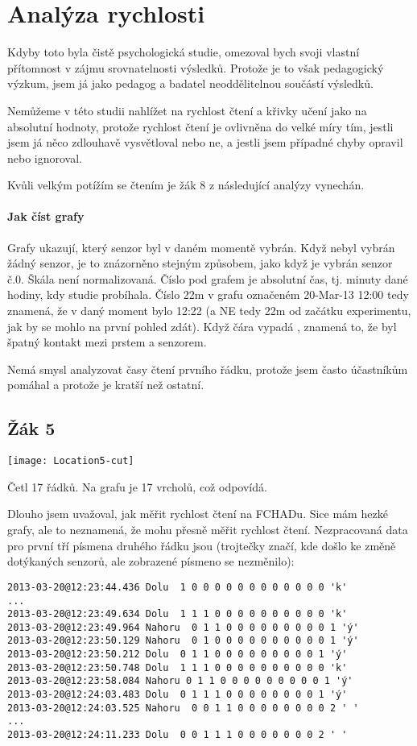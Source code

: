 \section{Analýza rychlosti}
Kdyby toto byla čistě psychologická studie, omezoval bych svoji vlastní přítomnost v zájmu srovnatelnosti výsledků.  Protože je to však pedagogický výzkum, jsem já jako pedagog a badatel neoddělitelnou součástí výsledků.

Nemůžeme v této studii nahlížet na rychlost čtení a křivky učení jako na absolutní hodnoty, protože rychlost čtení je ovlivněna do velké míry tím, jestli jsem já něco zdlouhavě vysvětloval nebo ne, a jestli jsem případné chyby opravil nebo ignoroval.

Kvůli velkým potížím se čtením je žák 8 z následující analýzy vynechán.

\paragraph{Jak číst grafy}  Grafy ukazují, který senzor byl v daném momentě vybrán.  Když nebyl vybrán žádný senzor, je to znázorněno stejným způsobem, jako když je vybrán senzor č.0.  Škála není normalizovaná. Číslo pod grafem je absolutní čas, tj. minuty dané hodiny, kdy studie probíhala.  Číslo 22m v grafu označeném 20-Mar-13 12:00 tedy znamená, že v daný moment bylo 12:22 (a NE tedy 22m od začátku experimentu, jak by se mohlo na první pohled zdát).  Když čára vypadá , znamená to, že byl špatný kontakt mezi prstem a senzorem.

Nemá smysl analyzovat časy čtení prvního řádku, protože jsem často účastníkům pomáhal a protože je kratší než ostatní.


\subsection{Žák 5}
\texttt{[image: Location5-cut]}

Četl 17 řádků. Na grafu je 17 vrcholů, což odpovídá.

Dlouho jsem uvažoval, jak měřit rychlost čtení na FCHADu.  Sice mám hezké grafy, ale to neznamená, že mohu přesně měřit rychlost čtení.  Nezpracovaná data pro první tří písmena druhého řádku jsou (trojtečky značí, kde došlo ke změně dotýkaných senzorů, ale zobrazené písmeno se nezměnilo):
\begin{verbatim}
2013-03-20@12:23:44.436 Dolu  1 0 0 0 0 0 0 0 0 0 0 0 0 'k'
...
2013-03-20@12:23:49.634 Dolu  1 1 1 0 0 0 0 0 0 0 0 0 0 'k'
2013-03-20@12:23:49.964 Nahoru  0 1 1 0 0 0 0 0 0 0 0 0 1 'ý'
2013-03-20@12:23:50.129 Nahoru  0 1 0 0 0 0 0 0 0 0 0 0 1 'ý'
2013-03-20@12:23:50.212 Dolu  0 1 1 0 0 0 0 0 0 0 0 0 1 'ý'
2013-03-20@12:23:50.748 Dolu  1 1 1 0 0 0 0 0 0 0 0 0 0 'k'
2013-03-20@12:23:58.084 Nahoru 0 1 1 0 0 0 0 0 0 0 0 0 1 'ý'
2013-03-20@12:24:03.483 Dolu  0 1 1 1 0 0 0 0 0 0 0 0 1 'ý'
2013-03-20@12:24:03.525 Nahoru  0 0 1 1 0 0 0 0 0 0 0 0 2 ' '
...
2013-03-20@12:24:11.233 Dolu  0 0 1 1 1 0 0 0 0 0 0 0 2 ' '

\end{verbatim}

